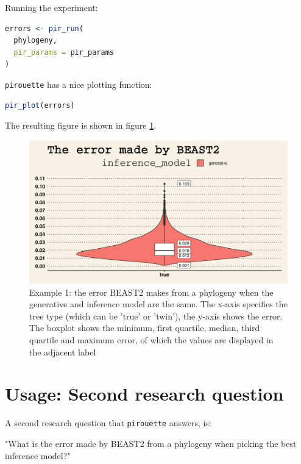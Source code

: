 \documentclass{article}
\begin{document}
Running the experiment:

\begin{lstlisting}[language=R, floatplacement=H, frame=single]
errors <- pir_run(
  phylogeny,
  pir_params = pir_params
)
\end{lstlisting}

\verb;pirouette; has a nice plotting function:

\begin{lstlisting}[language=R, floatplacement=H, frame=single]
pir_plot(errors)
\end{lstlisting}

The resulting figure is shown in figure \ref{fig:example_1}.

\begin{figure}[h]
  \includegraphics[width=\textwidth]{figure_example_1.png}
  \caption{
    Example 1: the error BEAST2 makes from a phylogeny 
    when the generative and inference model are the same.
    The x-axis specifies the tree type (which can be 'true' or 'twin'), 
    the y-axis shows the error. 
    The boxplot shows the minimum, first quartile, median, third 
    quartile and maximum error, of which the values are displayed 
    in the adjacent label
  }
  \label{fig:example_1}
\end{figure}

\section{Usage: Second research question}

A second research question that \verb;pirouette; answers, is:

"What is the error made by BEAST2 from a phylogeny when
picking the best inference model?"
\end{document}
